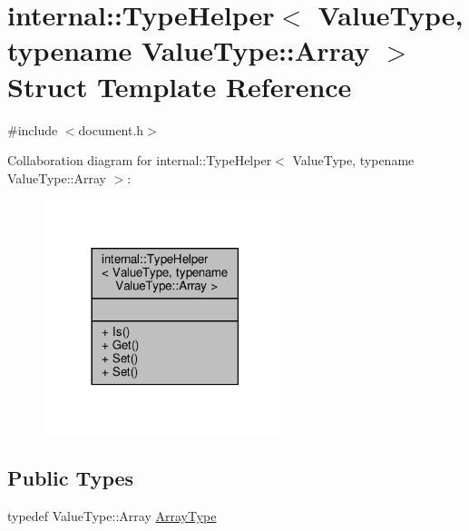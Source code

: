 \hypertarget{structinternal_1_1TypeHelper_3_01ValueType_00_01typename_01ValueType_1_1Array_01_4}{}\section{internal\+:\+:Type\+Helper$<$ Value\+Type, typename Value\+Type\+:\+:Array $>$ Struct Template Reference}
\label{structinternal_1_1TypeHelper_3_01ValueType_00_01typename_01ValueType_1_1Array_01_4}


{\ttfamily \#include $<$document.\+h$>$}



Collaboration diagram for internal\+:\+:Type\+Helper$<$ Value\+Type, typename Value\+Type\+:\+:Array $>$\+:
\nopagebreak
\begin{figure}[H]
\begin{center}
\leavevmode
\includegraphics[width=201pt]{structinternal_1_1TypeHelper_3_01ValueType_00_01typename_01ValueType_1_1Array_01_4__coll__graph}
\end{center}
\end{figure}
\subsection*{Public Types}
\begin{DoxyCompactItemize}
\item 
typedef Value\+Type\+::\+Array \hyperlink{structinternal_1_1TypeHelper_3_01ValueType_00_01typename_01ValueType_1_1Array_01_4_a8f384dc96b6104e85b956ec5f7386434}{Array\+Type}
\end{DoxyCompactItemize}
